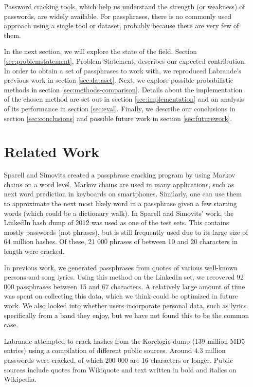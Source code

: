 \documentclass{article}
\begin{document}
Password cracking tools, which help us understand the strength (or weakness) of
passwords, are widely available. For passphrases, there is no commonly used
approach using a single tool or dataset, probably because there are very few of
them.

In the next section, we will explore the state of the field. Section
\ref{sec:problemstatement}, Problem Statement, describes our expected
contribution. In order to obtain a set of passphrases to work with, we
reproduced Labrande's previous work in section \ref{sec:dataset}. Next, we
explore possible probabilistic methods in section \ref{sec:methods-comparison}.
Details about the implementation of the chosen method are set out in section
\ref{sec:implementation} and an analysis of its performance in section
\ref{sec:eval}. Finally, we describe our conclusions in section
\ref{sec:conclusions} and possible future work in section \ref{sec:futurework}.


\section{Related Work}

Sparell and Simovits\cite{sparell-simovits} created a passphrase cracking
program by using Markov chains on a word level. Markov chains are used in many
applications, such as next word prediction in keyboards on smartphones.
Similarly, one can use them to approximate the next most likely word in a
passphrase given a few starting words (which could be a dictionary walk). In
Sparell and Simovits' work, the LinkedIn hash dump of 2012 was used as one of
the test sets. This contains mostly passwords (not phrases), but is still
frequently used due to its large size of 64 million hashes. Of these, 21 000
phrases of between 10 and 20 characters in length were cracked.

In previous work, we\cite{own} generated passphrases from quotes of various
well-known persons and song lyrics. Using this method on the LinkedIn set, we
recovered 92 000 passphrases between 15 and 67 characters. A relatively large
amount of time was spent on collecting this data, which we think could be
optimized in future work. We also looked into whether users incorporate
personal data, such as lyrics specifically from a band they enjoy, but we have
not found this to be the common case.

Labrande\cite{crackmeimfamous} attempted to crack hashes from the Korelogic
dump (139 million MD5 entries) using a compilation of different public sources.
Around 4.3 million passwords were cracked, of which 200 000 are 16 characters
or longer. Public sources include quotes from Wikiquote and text written in
bold and italics on Wikipedia.
\end{document}
